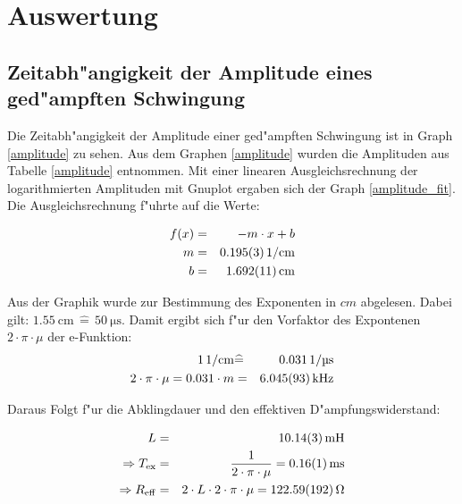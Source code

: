 \section{Auswertung}
	\label{sec:auswertung}
	

	\subsection{Zeitabh"angigkeit der Amplitude eines ged"ampften Schwingung} %
	\label{sub:zeitabh"angigkeit_der_amplitude_eines_ged"ampften_schwingung}
	
	Die Zeitabh"angigkeit der Amplitude einer ged"ampften Schwingung ist in Graph \eqref{amplitude} zu sehen.
	Aus dem Graphen \eqref{amplitude} wurden die Amplituden aus Tabelle \eqref{amplitude} entnommen. Mit einer linearen Ausgleichsrechnung der logarithmierten  Amplituden mit Gnuplot ergaben sich der Graph \eqref{amplitude_fit}. Die Ausgleichsrechnung f"uhrte auf die Werte:

	\begin{eqnarray}
		f(x) &=& -m \cdot x + b\\ \label{ausgleich}
		m &=& \SI{0.195 (3)}{1\per\centi\meter} \nonumber\\
		b &=& \SI{1.692 (11)}{\centi\meter}\nonumber 
	\end{eqnarray}

	Aus der Graphik wurde zur Bestimmung des Exponenten in $cm$ abgelesen.
	Dabei gilt: $\SI{1.55}{\centi\meter}\, \widehat{=} \,\SI{50}{\micro\second}$.
	Damit ergibt sich f"ur den Vorfaktor des Expontenen $2 \cdot \pi \cdot \mu$ der e-Funktion: 
	\begin{eqnarray*}
		\SI{1}{1\per\centi\meter} &\widehat{=}& \SI{0.031}{1\per\micro\second}\\
		2\cdot \pi \cdot \mu  = 0.031 \cdot m &=&  \SI{6.045 (93)}{\kilo \hertz}
	\end{eqnarray*}

	Daraus Folgt f"ur die Abklingdauer und den effektiven D"ampfungswiderstand:

	\begin{eqnarray*}
		L &=& \SI{10.14 (3)}{\milli \henry }\\
		\Rightarrow T_\mathrm{ex} &=& \frac{1}{2 \cdot \pi \cdot \mu} = \SI{0.16 (1)}{\milli \second}\\
		\Rightarrow R_\mathrm{eff} &=& 2 \cdot L \cdot 2 \cdot \pi \cdot \mu = \SI{122.59 (192)}{\ohm}
	\end{eqnarray*}
	\newpage


